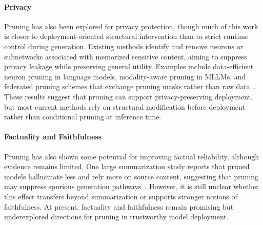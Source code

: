 
\paragraph{Privacy}
Pruning has also been explored for privacy protection, though much of this work is closer to deployment-oriented structural intervention than to strict runtime control during generation. Existing methods identify and remove neurons or subnetworks associated with memorized sensitive content, aiming to suppress privacy leakage while preserving general utility. Examples include data-efficient neuron pruning in language models, modality-aware pruning in MLLMs, and federated pruning schemes that exchange pruning masks rather than raw data~\citep{pochinkov2024dissecting, liu-etal-2025-modality, guo2025exploring}. These results suggest that pruning can support privacy-preserving deployment, but most current methods rely on structural modification before deployment rather than conditional pruning at inference time.

\paragraph{Factuality and Faithfulness}
Pruning has also shown some potential for improving factual reliability, although evidence remains limited. One large summarization study reports that pruned models hallucinate less and rely more on source content, suggesting that pruning may suppress spurious generation pathways~\citep{chrysostomou2024investigating}. However, it is still unclear whether this effect transfers beyond summarization or supports stronger notions of faithfulness. At present, factuality and faithfulness remain promising but underexplored directions for pruning in trustworthy model deployment.

